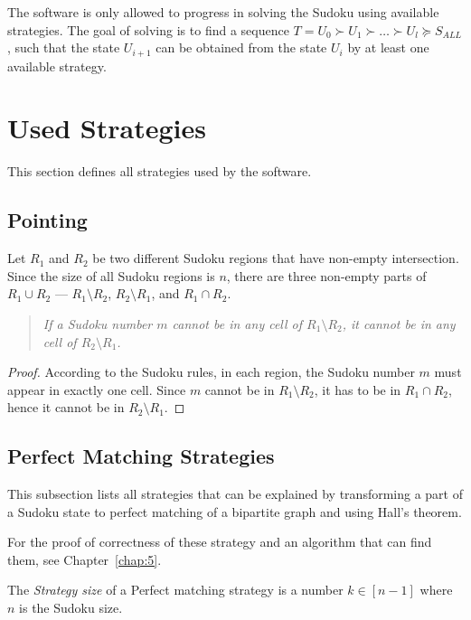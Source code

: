 The software is only allowed to progress in solving the Sudoku using available strategies.
The goal of solving is to find a sequence $T = U_0 \succ U_1 \succ \dots \succ U_l \succeq S_{ALL}$,
such that the state $U_{i + 1}$ can be obtained from the state $U_i$ by at least one available strategy.

\section{Used Strategies}

This section defines all strategies used by the software.

\subsection{Pointing}

Let $R_1$ and $R_2$ be two different Sudoku regions that have non-empty intersection.
Since the size of all Sudoku regions is $n$, there are three non-empty parts of $R_1 \cup R_2$ ---
$R_1 \setminus R_2$, $R_2 \setminus R_1$, and $R_1 \cap R_2$.

\begin{quote}
    \textit{
        If a Sudoku number $m$ cannot be in any cell of $R_1 \setminus R_2$, it cannot be in any cell of $R_2 \setminus R_1$.
    }
\end{quote}

\begin{proof}
    According to the Sudoku rules, in each region, the Sudoku number $m$ must appear in exactly one cell.
    Since $m$ cannot be in $R_1 \setminus R_2$, it has to be in $R_1 \cap R_2$,
    hence it cannot be in $R_2 \setminus R_1$.
\end{proof}

\subsection{Perfect Matching Strategies}

This subsection lists all strategies that can be explained by transforming a part of a Sudoku state to
perfect matching of a bipartite graph and using Hall's theorem.

For the proof of correctness of these strategy and an algorithm that can find them, see Chapter~\ref{chap:5}.

\begin{defn}
    The \emph{Strategy size} of a Perfect matching strategy is a number $k \in [n - 1]$ where $n$ is the Sudoku size.
\end{defn}

